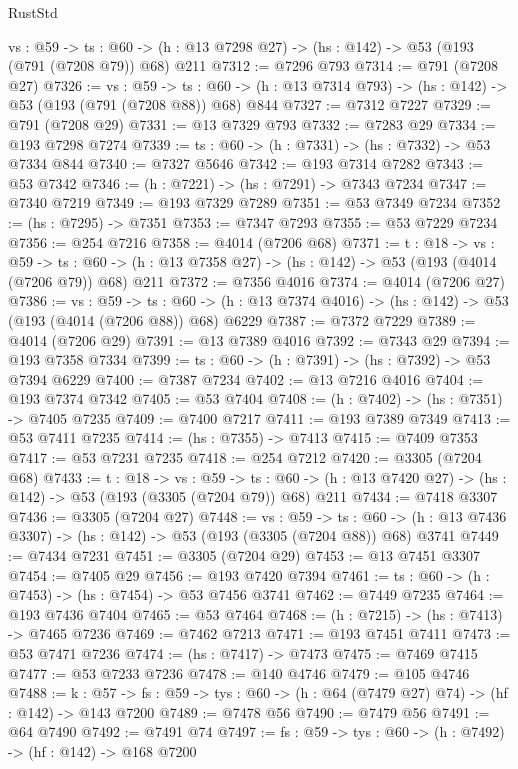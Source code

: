 \begin{lexlean}{RustStd}
\begin{coremodule}
  {vs : @59} ->
  {ts : @60} -> (h : @13 @7298 @27) -> (hs : @142) -> @53 (@193 (@791 (@7208 @79)) @68) @211
@7312 := @7296 @793
@7314 := @791 (@7208 @27)
@7326 := {vs : @59} ->
  {ts : @60} -> (h : @13 @7314 @793) -> (hs : @142) -> @53 (@193 (@791 (@7208 @88)) @68) @844
@7327 := @7312 @7227
@7329 := @791 (@7208 @29)
@7331 := @13 @7329 @793
@7332 := @7283 @29
@7334 := @193 @7298 @7274
@7339 := {ts : @60} -> (h : @7331) -> (hs : @7332) -> @53 @7334 @844
@7340 := @7327 @5646
@7342 := @193 @7314 @7282
@7343 := @53 @7342
@7346 := (h : @7221) -> (hs : @7291) -> @7343 @7234
@7347 := @7340 @7219
@7349 := @193 @7329 @7289
@7351 := @53 @7349 @7234
@7352 := (hs : @7295) -> @7351
@7353 := @7347 @7293
@7355 := @53 @7229 @7234
@7356 := @254 @7216
@7358 := @4014 (@7206 @68)
@7371 := {t : @18} ->
  {vs : @59} ->
  {ts : @60} -> (h : @13 @7358 @27) -> (hs : @142) -> @53 (@193 (@4014 (@7206 @79)) @68) @211
@7372 := @7356 @4016
@7374 := @4014 (@7206 @27)
@7386 := {vs : @59} ->
  {ts : @60} -> (h : @13 @7374 @4016) -> (hs : @142) -> @53 (@193 (@4014 (@7206 @88)) @68) @6229
@7387 := @7372 @7229
@7389 := @4014 (@7206 @29)
@7391 := @13 @7389 @4016
@7392 := @7343 @29
@7394 := @193 @7358 @7334
@7399 := {ts : @60} -> (h : @7391) -> (hs : @7392) -> @53 @7394 @6229
@7400 := @7387 @7234
@7402 := @13 @7216 @4016
@7404 := @193 @7374 @7342
@7405 := @53 @7404
@7408 := (h : @7402) -> (hs : @7351) -> @7405 @7235
@7409 := @7400 @7217
@7411 := @193 @7389 @7349
@7413 := @53 @7411 @7235
@7414 := (hs : @7355) -> @7413
@7415 := @7409 @7353
@7417 := @53 @7231 @7235
@7418 := @254 @7212
@7420 := @3305 (@7204 @68)
@7433 := {t : @18} ->
  {vs : @59} ->
  {ts : @60} -> (h : @13 @7420 @27) -> (hs : @142) -> @53 (@193 (@3305 (@7204 @79)) @68) @211
@7434 := @7418 @3307
@7436 := @3305 (@7204 @27)
@7448 := {vs : @59} ->
  {ts : @60} -> (h : @13 @7436 @3307) -> (hs : @142) -> @53 (@193 (@3305 (@7204 @88)) @68) @3741
@7449 := @7434 @7231
@7451 := @3305 (@7204 @29)
@7453 := @13 @7451 @3307
@7454 := @7405 @29
@7456 := @193 @7420 @7394
@7461 := {ts : @60} -> (h : @7453) -> (hs : @7454) -> @53 @7456 @3741
@7462 := @7449 @7235
@7464 := @193 @7436 @7404
@7465 := @53 @7464
@7468 := (h : @7215) -> (hs : @7413) -> @7465 @7236
@7469 := @7462 @7213
@7471 := @193 @7451 @7411
@7473 := @53 @7471 @7236
@7474 := (hs : @7417) -> @7473
@7475 := @7469 @7415
@7477 := @53 @7233 @7236
@7478 := @140 @4746
@7479 := @105 @4746
@7488 := {k : @57} ->
  {fs : @59} -> {tys : @60} -> (h : @64 (@7479 @27) @74) -> (hf : @142) -> @143 @7200
@7489 := @7478 @56
@7490 := @7479 @56
@7491 := @64 @7490
@7492 := @7491 @74
@7497 := {fs : @59} -> {tys : @60} -> (h : @7492) -> (hf : @142) -> @168 @7200

\end{coremodule}
\end{lexlean}

